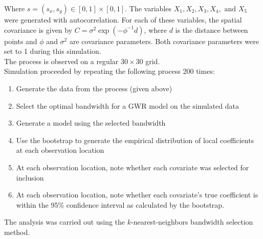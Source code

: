 \documentclass[authoryear, review, 11pt]{elsarticle}
\begin{document}
			Where $s=(s_x, s_y) \in [0,1] \times [0,1]$. The variables $X_1, X_2, X_3, X_4, \text{ and } X_5$ were generated with autocorrelation. For each of these variables, the spatial covariance is given by $C = \sigma^2 \exp(-\phi^{-1} d)$, where $d$ is the distance between points and $\phi$ and $\sigma^2$ are covariance parameters. Both covariance parameters were set to 1 during this simulation.\\

			The process is observed on a regular $30 \times 30$ grid.\\		
			
			Simulation proceeded by repeating the following process 200 times:\\
			
			\begin{enumerate}
				\item Generate the data from the process (given above)
				\item Select the optimal bandwidth for a GWR model on the simulated data
				\item Generate a model using the selected bandwidth
				\item Use the bootstrap to generate the empirical distribution of local coefficients at each observation location
				\item At each observation location, note whether each covariate was selected for inclusion
				\item At each observation location, note whether each covariate's true coefficient is within the 95\% confidence interval as calculated by the bootstrap.
			\end{enumerate}
				
			The analysis was carried out using the $k$-nearest-neighbors bandwidth selection method.\\			
			
\end{document}
